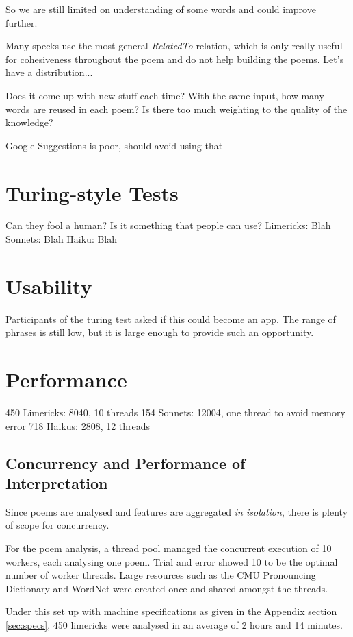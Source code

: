 So we are still limited on understanding of some words and could improve further.

Many specks use the most general \textit{RelatedTo} relation, which is only really useful for cohesiveness throughout the poem and do not help building the poems. Let's have a distribution...

Does it come up with new stuff each time? With the same input, how many words are reused in each poem? Is there too much weighting to the quality of the knowledge?

Google Suggestions is poor, should avoid using that

\section{Turing-style Tests}
Can they fool a human?
Is it something that people can use?
Limericks: Blah
Sonnets: Blah
Haiku: Blah

\section{Usability}
Participants of the turing test asked if this could become an app. The range of phrases is still low, but it is large enough to provide such an opportunity. 

\section{Performance}

450 Limericks: 8040, 10 threads
154 Sonnets: 12004, one thread to avoid memory error
718 Haikus: 2808, 12 threads


\subsection{Concurrency and Performance of Interpretation}
\label{sec:interpret-perf}

Since poems are analysed and features are aggregated \textit{in isolation}, there is plenty of scope for concurrency.

For the poem analysis, a thread pool managed the concurrent execution of 10 workers, each analysing one poem. Trial and error showed 10 to be the optimal number of worker threads. Large resources such as the CMU Pronouncing Dictionary and WordNet were created once and shared amongst the threads.

Under this set up with machine specifications as given in the Appendix section \ref{sec:specs}, 450 limericks were analysed in an average of 2 hours and 14 minutes.

